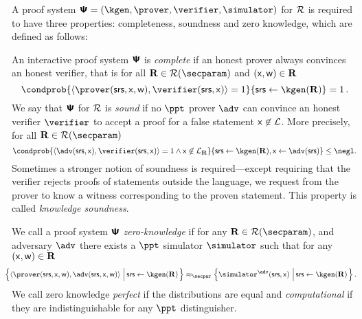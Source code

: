 A proof system $\proofsystem = (\kgen, \prover, \verifier, \simulator)$ for
$\mathcal{R}$ is required to have three properties: completeness, soundness and zero
knowledge, which are defined as follows:

  An interactive proof system $\bm{\mathsf{\Psi}}$ is
  \emph{complete} if an honest prover always convinces an honest verifier, that
  is for all $\REL \in \RELGEN(\secparam)$ and $(\mathsf{x}, \mathsf{w}) \in \mathbf{R}$
	\[
		\condprob{\ip{\prover (\srs, \inp, \wit)}{\verifier (\srs,
        \inp)} = 1}{\srs \gets \kgen(\REL)} = 1\,.
	\]
    We say that $\bm{\mathsf{\Psi}}$ for $\mathcal{R}$ is \emph{sound} if no
  $\ppt$ prover $\adv$ can convince an honest verifier $\verifier$ to accept a
  proof for a false statement $\mathsf{x} \not\in\mathcal{L}$. More precisely, for
  all $\REL \in \RELGEN(\secparam)$
	\[
    \condprob{\ip{\adv(\srs, \inp)}{\verifier(\srs, \inp)} = 1 \land \inp
      \not\in \LANG_\REL}{\srs \gets \kgen(\REL), \inp \gets \adv(\srs)} \leq
    \negl.
	\]
Sometimes a stronger notion of soundness is required---except requiring that the
verifier rejects proofs of statements outside the language, we request from the
prover to know a witness corresponding to the proven statement. This property is
called \emph{knowledge soundness}.%
 
  We call a proof system $\bm{\mathsf{\Psi}}$
\emph{zero-knowledge} if for any $\REL \in \RELGEN(\secparam)$, and adversary
$\adv$ there exists a $\ppt$ simulator $\simulator$ such that for any
$(\mathsf{x}, \mathsf{w}) \in \mathbf{R}$
\begin{multline*}
\hspace{-10pt}	  \left\{\ip{\prover(\srs, \inp, \wit)}{\adv(\srs, \inp, \wit)}
      \,\left|\, \srs \gets \kgen(\REL)\COMMENT{, (\inp, \wit) \gets \adv(\REL,
          \srs)}\vphantom{\simulator^\adv}\right.\right\} \approx_\secpar
		\left\{\simulator^{\adv}(\srs, \inp)\,\left|\, \srs \gets
        \kgen(\REL)\COMMENT{, (\inp, \wit) \gets \adv(\REL,
          \srs)}\vphantom{\simulator^\adv}\right.\right\}.
\end{multline*}
We call zero knowledge \emph{perfect} if the distributions are equal and
\emph{computational} if they are indistinguishable for any $\ppt$ distinguisher.


